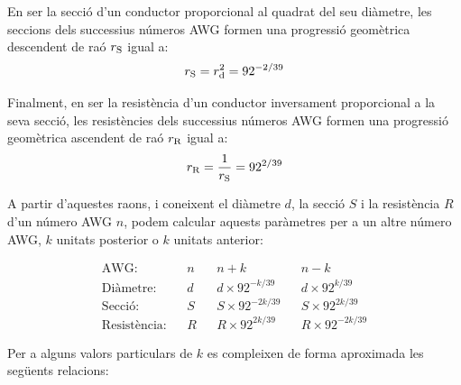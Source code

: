 En ser la secci\'{o} d'un conductor proporcional al quadrat del seu di\`{a}metre, les seccions dels successius n\'{u}meros AWG formen una progressi\'{o} geom\`{e}trica  descendent de ra\'{o} $r_\mathrm{S}$ igual a: \begin{equation}
   r_\mathrm{S} = r_\mathrm{d}^2 = 92^{-2/39}
\end{equation}

Finalment, en ser la resist\`{e}ncia d'un conductor inversament proporcional a la seva secci\'{o}, les resist\`{e}ncies dels successius n\'{u}meros AWG formen una progressi\'{o} geom\`{e}trica ascendent de ra\'{o} $r_\mathrm{R}$ igual a:
\begin{equation}
   r_\mathrm{R} = \frac{1}{r_\mathrm{S}} = 92^{2/39}
\end{equation}

A partir d'aquestes raons, i coneixent el di\`{a}metre $d$, la secci\'{o} $S$ i la resist\`{e}ncia $R$ d'un n\'{u}mero AWG $n$, podem calcular aquests par\`{a}metres per a un altre n\'{u}mero AWG, $k$ unitats posterior o $k$ unitats anterior:

\begin{equation}
   \begin{array}{rllllll}
     \text{AWG:}         & & n & & n+k                & & n-k \\
     \text{Di\`{a}metre:}    & & d & & d\times 92^{-k/39}  & & d\times 92^{k/39} \\
     \text{Secci\'{o}:}      & & S & & S\times 92^{-2k/39} & & S\times 92^{2k/39} \\
     \text{Resist\`{e}ncia:} & & R & & R\times 92^{2k/39}  & & R\times 92^{-2k/39}
   \end{array}
\end{equation}

Per a alguns valors particulars de $k$ es compleixen de forma aproximada les seg\"{u}ents relacions:

